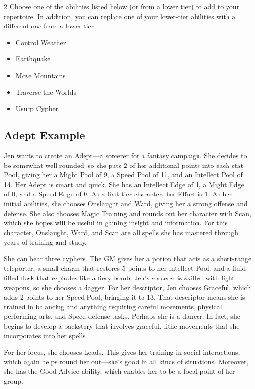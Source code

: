 \begin{multicols}{2}
Choose one of the abilities listed below (or from a lower tier) to add to your repertoire. In addition, you can replace one of your lower-tier abilities with a different one from a lower tier.

\begin{itemize}
\item Control Weather
\item Earthquake
\item Move Mountains
\item Traverse the Worlds
\item Usurp Cypher
\end{itemize}

\subsection{Adept Example}

Jen wants to create an Adept—a sorcerer for a fantasy campaign. She decides to be somewhat well rounded, so she puts 2 of her additional points into each stat Pool, giving her a Might Pool of 9, a Speed Pool of 11, and an Intellect Pool of 14. Her Adept is smart and quick. She has an Intellect Edge of 1, a Might Edge of 0, and a Speed Edge of 0. As a first-tier character, her Effort is 1. As her initial abilities, she chooses Onslaught and Ward, giving her a strong offense and defense. She also chooses Magic Training and rounds out her character with Scan, which she hopes will be useful in gaining insight and information. For this character, Onslaught, Ward, and Scan are all spells she has mastered through years of training and study.

She can bear three cyphers. The GM gives her a potion that acts as a short-range teleporter, a small charm that restores 5 points to her Intellect Pool, and a fluid-filled flask that explodes like a fiery bomb. Jen’s sorcerer is skilled with light weapons, so she chooses a dagger. 
For her descriptor, Jen chooses Graceful, which adds 2 points to her Speed Pool, bringing it to 13. That descriptor means she is trained in balancing and anything requiring careful movements, physical performing arts, and Speed defense tasks. Perhaps she is a dancer. In fact, she begins to develop a backstory that involves graceful, lithe movements that she incorporates into her spells.

For her focus, she chooses Leads. This gives her training in social interactions, which again helps round her out—she’s good in all kinds of situations. Moreover, she has the Good Advice ability, which enables her to be a focal point of her group.


\end{multicols}
